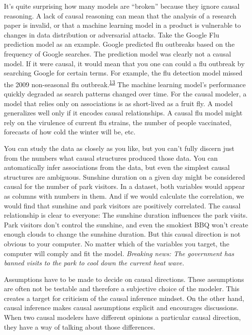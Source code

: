 \documentclass[
  10pt,
]{scrbook}
\begin{document}
It's quite surprising how many models are ``broken'' because they ignore causal reasoning.
A lack of causal reasoning can mean that the analysis of a research paper is invalid, or that a machine learning model in a product is vulnerable to changes in data distribution or adversarial attacks.
Take the Google Flu prediction model as an example.
Google predicted flu outbreaks based on the frequency of Google searches.
The prediction model was clearly not a causal model.
If it were causal, it would mean that you one can could a flu outbreak by searching Google for certain terms.
For example, the flu detection model missed the 2009 non-seasonal flu outbreak.\textsuperscript{\protect\hyperlink{ref-lazer2014parable}{13}}
The machine learning model's performance quickly degraded as search patterns changed over time.
For the causal modeler, a model that relies only on associations is as short-lived as a fruit fly.
A model generalizes well only if it encodes causal relationships.
A causal flu model might rely on the virulence of current flu strains, the number of people vaccinated, forecasts of how cold the winter will be, etc.

You can study the data as closely as you like, but you can't fully discern just from the numbers what causal structures produced those data.
You can automatically infer associations from the data, but even the simplest causal structures are ambiguous.
Sunshine duration on a given day might be considered causal for the number of park visitors.
In a dataset, both variables would appear as columns with numbers in them.
And if we would calculate the correlation, we would find that sunshine and park visitors are positively correlated.
The causal relationship is clear to everyone:
The sunshine duration influences the park visits.
Park visitors don't control the sunshine, and even the smokiest BBQ won't create enough clouds to change the sunshine duration.
But this causal direction is not obvious to your computer.
No matter which of the variables you target, the computer will comply and fit the model.
\emph{Breaking news: The government has banned visits to the park to cool down the current heat wave.}

Assumptions have to be made to decide on causal directions.
These assumptions are often not be testable and therefore a subjective choice of the modeler.
This creates a target for criticism of the causal inference mindset.
On the other hand, causal inference makes causal assumptions explicit and encourages discussions.
When two causal modelers have different opinions a particular causal direction, they have a way of talking about those differences.
\end{document}
